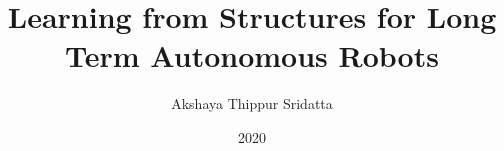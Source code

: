 \title{Learning from Structures for Long Term Autonomous Robots}
\author{Akshaya Thippur Sridatta}
\date{2020}
\address{Robotics, Perception and Learning\\
         School of Computer Science and Communication\\
         KTH Royal Institute of Technology\\
         SE-100 44 Stockholm, Sweden}
         
\endinput




